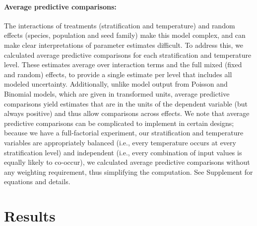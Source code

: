 \documentclass[11pt]{article}\usepackage[]{graphicx}\usepackage[]{color}
\begin{document}
	\paragraph{Average predictive comparisons:} The interactions of treatments (stratification and temperature) and random effects (species, population and seed family) make this model complex, and can make clear interpretations of parameter estimates difficult. To address this, we calculated average predictive comparisons \parencite{Gelman2007} for each stratification and temperature level. These estimates average over interaction terms and the full mixed (fixed and random) effects, to provide a single estimate per level that includes all modeled uncertainty. Additionally, unlike model output from Poisson and Binomial models, which are given in transformed units, average predictive comparisons yield estimates that are in the units of the dependent variable (but always positive) \parencite{Gelman2007} and thus allow comparisons across effects. We note that average predictive comparisons can be complicated to implement in certain designs; because we have a full-factorial experiment, our stratification and temperature variables are appropriately balanced (i.e., every temperature occurs at every stratification level) and independent (i.e., every combination of input values is equally likely to co-occur), we calculated average predictive comparisons without any weighting requirement, thus simplifying the computation. See Supplement for equations and details. %

	\section{Results} 
		
\end{document}
